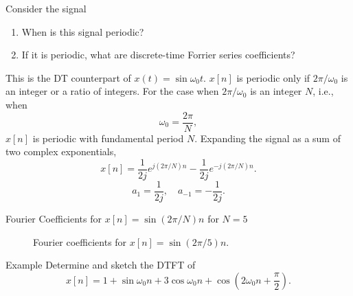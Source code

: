 \begin{frame}
    \begin{example}
        Consider the signal
        \begin{enumerate}
            \item When is this signal periodic?
            \item If it is periodic, what are discrete-time Forrier series coefficients?
        \end{enumerate}
    \end{example}
    \pause
    {
        This is the DT counterpart of $x(t) = \sin \omega_0 t$. $x[n]$ is periodic only if $2\pi/\omega_0$ is an integer or a ratio of integers. For the case when $2\pi/\omega_0$ is an integer $N$, i.e., when
        \begin{equation*}
            \omega_0 = \frac{2\pi}{N},
        \end{equation*}
        $x[n]$ is periodic with fundamental period $N$.
    }
    \pause
    {
        Expanding the signal as a sum of two complex exponentials,
        \begin{equation}
            x[n] = \frac{1}{2j}e^{j(2\pi/N)n} - \frac{1}{2j}e^{-j(2\pi/N)n}.
        \end{equation}
        \pause
        \begin{equation*}
            a_1 = \frac{1}{2j}, \quad a_{-1} = -\frac{1}{2j}.
        \end{equation*}
    }

\end{frame}

\begin{frame}{Fourier Coefficients for $x[n] = \sin(2\pi/N)n$ for $N=5$ }
    \begin{figure}
        \centering
        
        \caption{Fourier coefficients for $x[n] = \sin(2\pi/5)n$.}
    \end{figure}
\end{frame}

\begin{frame}{Example}
    Determine and sketch the DTFT of
    \begin{equation*}
        x[n] = 1 + \sin \omega_0 n + 3 \cos \omega_0 n + \cos\left(2\omega_0 n + \frac{\pi}{2}\right).
    \end{equation*}
    \pause
\end{frame}

\begin{frame}
    \begin{figure}
        \centering
        
    \end{figure}
\end{frame}

